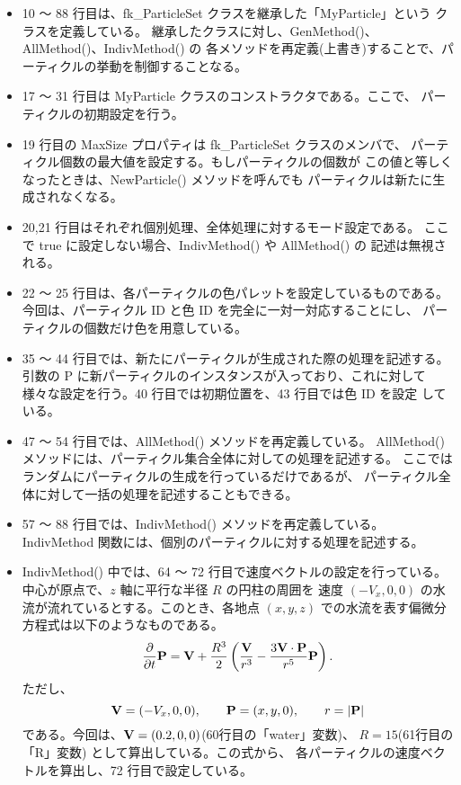 \begin{itemize}
 \item 10 〜 88 行目は、fk\_ParticleSet クラスを継承した「MyParticle」という
	クラスを定義している。
	継承したクラスに対し、GenMethod()、AllMethod()、IndivMethod() の
	各メソッドを再定義(上書き)することで、パーティクルの挙動を制御することなる。

 \item 17 〜 31 行目は MyParticle クラスのコンストラクタである。ここで、
	パーティクルの初期設定を行う。

 \item 19 行目の MaxSize プロパティは fk\_ParticleSet クラスのメンバで、
	パーティクル個数の最大値を設定する。もしパーティクルの個数が
	この値と等しくなったときは、NewParticle() メソッドを呼んでも
	パーティクルは新たに生成されなくなる。

 \item 20,21 行目はそれぞれ個別処理、全体処理に対するモード設定である。
	ここで true に設定しない場合、IndivMethod() や AllMethod() の
	記述は無視される。

 \item 22 〜 25 行目は、各パーティクルの色パレットを設定しているものである。
	今回は、パーティクル ID と色 ID を完全に一対一対応することにし、
	パーティクルの個数だけ色を用意している。

 \item 35 〜 44 行目では、新たにパーティクルが生成された際の処理を記述する。
	引数の P に新パーティクルのインスタンスが入っており、これに対して
	様々な設定を行う。40 行目では初期位置を、43 行目では色 ID を設定
	している。

 \item 47 〜 54 行目では、AllMethod() メソッドを再定義している。
	AllMethod() メソッドには、パーティクル集合全体に対しての処理を記述する。
	ここではランダムにパーティクルの生成を行っているだけであるが、
	パーティクル全体に対して一括の処理を記述することもできる。

 \item 57 〜 88 行目では、IndivMethod() メソッドを再定義している。
	IndivMethod 関数には、個別のパーティクルに対する処理を記述する。

 \item IndivMethod() 中では、64 〜 72 行目で速度ベクトルの設定を行っている。
	中心が原点で、\(z\) 軸に平行な半径 \(R\) の円柱の周囲を
	速度 \((-V_x, 0, 0)\) の水流が流れているとする。このとき、各地点
	\((x, y, z)\) での水流を表す偏微分方程式は以下のようなものである。
	\begin{equation}
		\frac{\partial}{\partial t}\mathbf{P} =
		\mathbf{V} + \frac{R^3}{2}
		\left(\frac{\mathbf{V}}{r^3} -
		\frac{3 \mathbf{V} \cdot \mathbf{P}}{r^5} \mathbf{P} \right) .
	\end{equation}
	ただし、
	\begin{equation}
		\mathbf{V} = (-V_x, 0, 0), \qquad
		\mathbf{P} = (x, y, 0), \qquad r = |\mathbf{P}|
	\end{equation}
	である。今回は、\(\mathbf{V} = (0.2, 0, 0)\)(60行目の「water」変数)、
	\(R = 15\)(61行目の「R」変数) として算出している。この式から、
	各パーティクルの速度ベクトルを算出し、72 行目で設定している。


\end{itemize}
